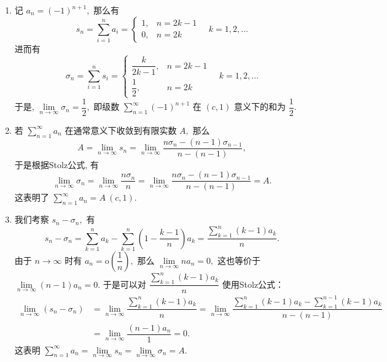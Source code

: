 \begin{solution}
  \begin{enumerate}
    \item 记 $a_n = (-1)^{n+1},$ 那么有
    $$s_n = \sum\limits_{i=1}^n a_i = \begin{cases}
      1, & n = 2k - 1\\
      0, & n = 2k
    \end{cases} \quad k = 1, 2, \dots$$
    进而有
    $$\sigma_n = \sum\limits_{i=1}^n s_i = \begin{cases}
      \dfrac{k}{2k - 1}, & n = 2k - 1\\
      \dfrac{1}{2}, & n = 2k
      \end{cases} \quad k = 1, 2, \dots$$
      于是, $\lim\limits_{n \to \infty} \sigma_n = \dfrac{1}{2},$ 即级数 $\sum\limits_{n=1}^{\infty} (-1)^{n+1}$ 在 $(c, 1)$ 意义下的和为 $\dfrac{1}{2}.$
     \item 若 $\sum\limits_{n=1}^{\infty} a_n$ 在通常意义下收敛到有限实数 $A,$ 那么
    $$A = \lim\limits_{n \to \infty} s_n = \lim\limits_{n \to \infty} \dfrac{n\sigma_n - (n-1)\sigma_{n-1}}{n - (n-1)}, $$
    于是根据Stolz公式, 有
    $$\lim\limits_{n \to \infty} \sigma_n = \lim\limits_{n \to \infty} \dfrac{n\sigma_n}{n} = \lim\limits_{n \to \infty} \dfrac{n\sigma_n - (n-1)\sigma_{n-1}}{n - (n-1)} = A.$$
    这表明了 $\sum\limits_{n=1}^{\infty} a_n = A~(c, 1).$
    \item 我们考察 $s_n - \sigma_n,$ 有
    $$s_n - \sigma_n = \sum\limits_{k=1}^n a_k - \sum\limits_{k=1}^n \left( 1 - \dfrac{k-1}{n} \right) a_k = \dfrac{\sum\limits_{k=1}^n (k-1)a_k}{n}.$$
    由于 $n \to \infty$ 时有 $a_n = \mathrm{o}\left( \dfrac{1}{n} \right),$ 那么 $\lim\limits_{n \to \infty} n a_n = 0,$ 这也等价于 $\lim\limits_{n \to \infty} (n - 1) a_n = 0.$ 于是可以对 $\dfrac{\sum\limits_{k=1}^n (k-1)a_k}{n}$ 使用Stolz公式：
    \begin{align*}
      \lim\limits_{n \to \infty} (s_n - \sigma_n) & = \lim\limits_{n \to \infty} \dfrac{\sum\limits_{k=1}^n (k-1)a_k}{n} = \lim\limits_{n \to \infty} \dfrac{\sum\limits_{k=1}^n (k-1)a_k - \sum\limits_{k=1}^{n-1} (k-1)a_k}{n - (n-1)} \\
      & = \lim\limits_{n \to \infty} \dfrac{(n-1)a_n}{1} = 0.
    \end{align*}
    这表明 $\sum\limits_{n=1}^{\infty} a_n = \lim\limits_{n \to \infty} s_n = \lim\limits_{n \to \infty} \sigma_n = A.$
  \end{enumerate}
\end{solution}


